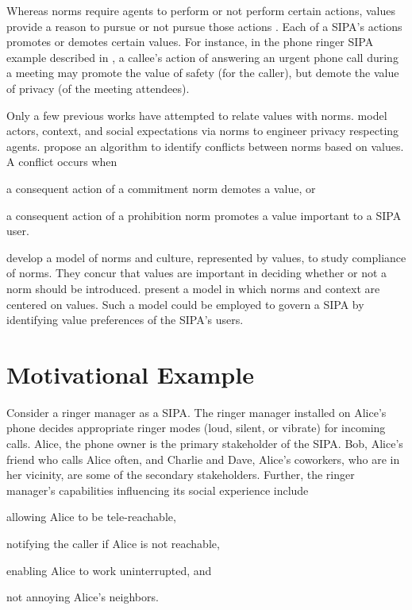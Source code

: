 Whereas norms require agents to perform or not perform certain actions, values provide a reason to pursue or not pursue those actions \cite{Dechesne-AIL13-Norms+Values}. 
Each of a SIPA's actions promotes or demotes certain values. 
For instance, in the phone ringer SIPA example described in \citet{Ajmeri-AAMAS17-Arnor}, a callee's action of answering an urgent phone call during a meeting may promote the value of safety (for the caller), but demote the value of privacy (of the meeting attendees).

Only a few previous works have attempted to relate values with norms.
\citet{Murukannaiah-IC16-Engineering} model actors, context, and social expectations via norms to engineer privacy respecting agents. 
\citet{DaSilvaFigueiredo-COIN13} propose an algorithm to identify conflicts between norms based on values. 
A conflict occurs when
\begin{enumerate*}[label=(\arabic*)]
\item a consequent action of a commitment norm demotes a value, or
\item a consequent action of a prohibition norm promotes a value important to a SIPA user.
\end{enumerate*}
%
\citet{Dechesne-AIL13-Norms+Values} develop a model of norms and culture,
represented by values, to study compliance of norms. They concur that
values are important in deciding whether or not a norm should be
introduced. \citet{kayal13coin} present a model in which norms and 
context are centered on values. Such a model could be employed
to govern a SIPA by identifying value preferences of the SIPA's
users.


\section{Motivational Example}
\begin{example}
\label{ex:intro-ringer-meeting} 
Consider a ringer manager as a SIPA. The ringer manager installed on 
Alice's phone decides appropriate ringer modes (loud, silent, or 
vibrate) for incoming calls. Alice, the phone owner is the 
primary stakeholder of the SIPA. Bob, Alice's friend who 
calls Alice often, and Charlie and Dave, Alice's coworkers, who are in 
her vicinity, are some of the secondary stakeholders. Further, the ringer 
manager's capabilities influencing its social experience include
\begin{enumerate*}[label=(\arabic*)]
\item allowing Alice to be tele-reachable, 
\item notifying the caller if Alice is not reachable,
\item enabling Alice to work uninterrupted, and
\item not annoying Alice's neighbors.
\end{enumerate*}
\end{example}

